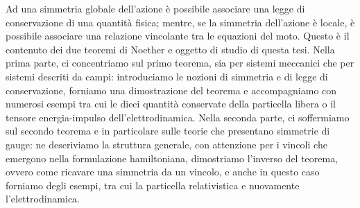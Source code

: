 \begin{Abstract}
\begin{changemargin}{1cm}{1cm}
    Ad una simmetria globale dell'azione è possibile associare una legge di conservazione di una quantità fisica; mentre, se la simmetria dell'azione è locale, è possibile associare una relazione vincolante tra le equazioni del moto. Questo è il contenuto dei due teoremi di Noether e oggetto di studio di questa tesi. Nella prima parte, ci concentriamo sul primo teorema, sia per sistemi meccanici che per sistemi descriti da campi: introduciamo le nozioni di simmetria e di legge di conservazione, forniamo una dimostrazione del teorema e accompagniamo con numerosi esempi tra cui le dieci quantità conservate della particella libera o il tensore energia-impulso dell'elettrodinamica. Nella seconda parte, ci soffermiamo sul secondo teorema e in particolare sulle teorie che presentano simmetrie di gauge: ne descriviamo la struttura generale, con attenzione per i vincoli che emergono nella formulazione hamiltoniana, dimostriamo l'inverso del teorema, ovvero come ricavare una simmetria da un vincolo, e anche in questo caso forniamo degli esempi, tra cui la particella relativistica e nuovamente l'elettrodinamica. 
\end{changemargin}
\end{Abstract}